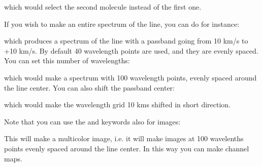 \documentclass[letterpaper,10pt,english]{sphinxmanual}
\begin{document}
which would select the second molecule instead of the first one.

If you wish to make an entire spectrum of the line, you can do for instance:

\begin{sphinxVerbatim}[commandchars=\\\{\}]
     
\end{sphinxVerbatim}

which produces a spectrum of the line with a passband going from \sphinxhyphen{}10 km/s to
+10 km/s. By default 40 wavelength points are used, and they are evenly
spaced. You can set this number of wavelengths:

\begin{sphinxVerbatim}[commandchars=\\\{\}]
       
\end{sphinxVerbatim}

which would make a spectrum with 100 wavelength points, evenly spaced around
the line center. You can also shift the passband center:

\begin{sphinxVerbatim}[commandchars=\\\{\}]
         
\end{sphinxVerbatim}

which would make the wavelength grid 10 kms shifted in short direction.

Note that you can use the  and  keywords also for
images:

\begin{sphinxVerbatim}[commandchars=\\\{\}]
       
\end{sphinxVerbatim}

This will make a multi\sphinxhyphen{}color image, i.e. it will make images at 100 wavelenths
points evenly spaced around the line center. In this way you can make channel
maps.
\end{document}
